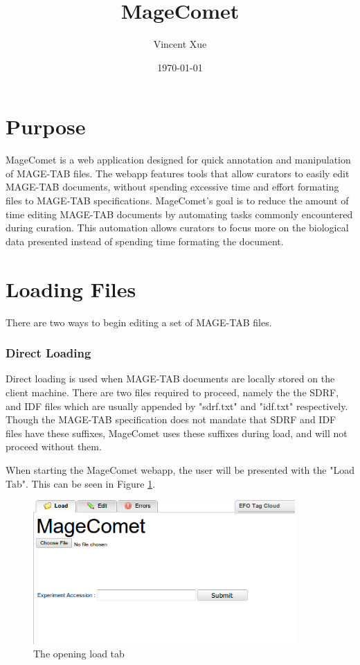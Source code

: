 \documentclass[a4paper]{article}
\title{MageComet}
\author{Vincent Xue}
\date{\today}
\begin{document}
\maketitle
\section{Purpose}
MageComet is a web application designed for quick annotation and manipulation of MAGE-TAB files. The webapp features tools that allow curators to easily edit MAGE-TAB documents, without spending excessive time and effort formating files to MAGE-TAB specifications. MageComet's goal is to reduce the amount of time editing MAGE-TAB documents by automating tasks commonly encountered during curation. This automation allows curators to focus more on the biological data presented instead of spending time formating the document.

\section{Loading Files}
There are two ways to begin editing a set of MAGE-TAB files.
\subsubsection*{Direct Loading}
Direct loading is used when MAGE-TAB documents are locally stored on the client machine. There are two files required to proceed, namely the the SDRF, and IDF files which are usually appended by "sdrf.txt" and "idf.txt" respectively. Though the MAGE-TAB specification does not mandate that SDRF and IDF files have these suffixes, MageComet uses these suffixes during load, and will not proceed without them.

When starting the MageComet webapp, the user will be presented with the "Load Tab". This can be seen in Figure \ref{initial}.

\begin{figure}[h]
\caption{The opening load tab}
\centering
\label{initial}
\includegraphics[width=10cm]{images/Load}
\end{figure}
\end{document}
